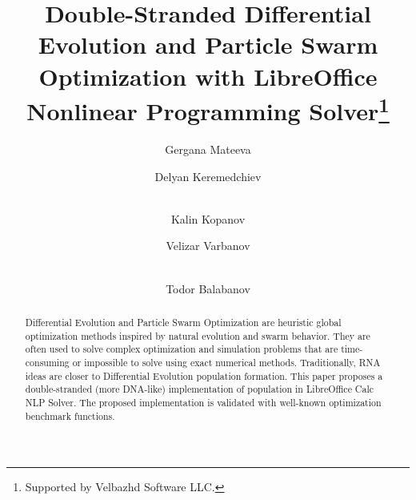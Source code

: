 \documentclass[runningheads]{llncs}
\begin{document}
\title{Double-Stranded Differential Evolution and Particle Swarm Optimization with LibreOffice Nonlinear Programming Solver\thanks{Supported by Velbazhd Software LLC.}}


\author{
Gergana Mateeva \and
Delyan Keremedchiev \and\\
Kalin Kopanov \and
Velizar Varbanov \and\\
Todor Balabanov 
}



\maketitle

\begin{abstract}
Differential Evolution and Particle Swarm Optimization are heuristic global optimization methods inspired by natural evolution and swarm behavior. They are often used to solve complex optimization and simulation problems that are time-consuming or impossible to solve using exact numerical methods. Traditionally, RNA ideas are closer to Differential Evolution population formation. This paper proposes a double-stranded (more DNA-like) implementation of population in LibreOffice Calc NLP Solver. The proposed implementation is validated with well-known optimization benchmark functions.

\end{abstract}
\end{document}
